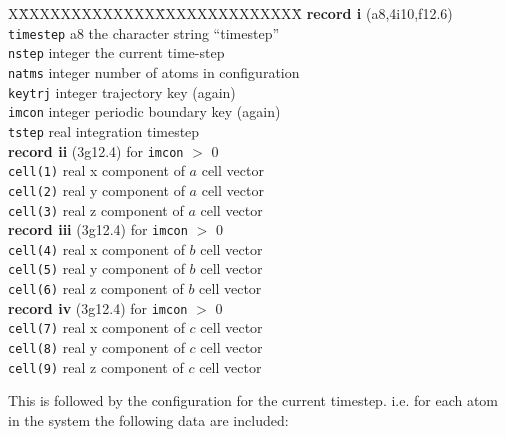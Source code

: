 \begin{tabbing}
X\=XXXXXXXXXXXXX\=XXXXXXXXXXXXXX\=\kill
{\bf record i} (a8,4i10,f12.6)\\
\> {\tt timestep} \> a8 \> the character string ``timestep''\\
\> {\tt nstep} \>  integer \> the current time-step\\
\> {\tt natms} \> integer \> number of atoms in configuration\\
\> {\tt keytrj} \> integer \> trajectory key (again) \\
\> {\tt imcon} \> integer \> periodic boundary key (again) \\
\> {\tt tstep} \> real \> integration timestep \\
{\bf record ii} (3g12.4) for {\tt imcon} $>$ 0\\
\> {\tt cell(1)} \> real \> x component of $a$ cell vector\\
\> {\tt cell(2)} \> real \> y component of $a$ cell vector\\
\> {\tt cell(3)} \> real \> z component of $a$ cell vector\\
{\bf record iii} (3g12.4) for {\tt imcon} $>$ 0\\
\> {\tt cell(4)} \> real \> x component of $b$ cell vector\\
\> {\tt cell(5)} \> real \> y component of $b$ cell vector\\
\> {\tt cell(6)} \> real \> z component of $b$ cell vector\\
{\bf record iv}  (3g12.4) for {\tt imcon} $>$ 0\\
\> {\tt cell(7)} \> real \> x component of $c$ cell vector\\
\> {\tt cell(8)} \> real \> y component of $c$ cell vector\\
\> {\tt cell(9)} \> real \> z component of $c$ cell vector\\
\end{tabbing}
This is followed by the configuration for the current timestep. i.e.
for each atom in the system the following data are included:
